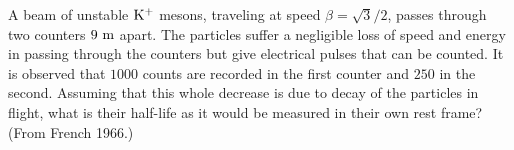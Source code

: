 \begin{problem}
A beam of unstable $\rm K^+$ mesons, traveling at speed
$\beta=\sqrt{3}/2$, passes through two counters $9~{\rm m}$ apart.
The particles suffer a negligible loss of speed and energy in passing
through the counters but give electrical pulses that can be counted.
It is observed that $1000$ counts are recorded in the first counter
and $250$ in the second.  Assuming that this whole decrease is due to
decay of the particles in flight, what is their half-life as it would
be measured in their own rest frame?  (From French 1966.)
\end{problem}
